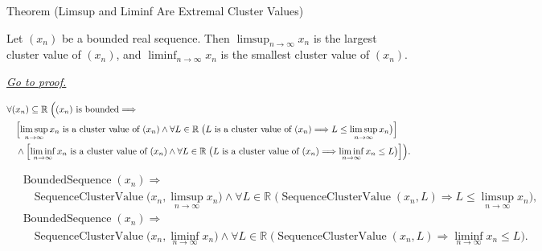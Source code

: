 \begin{theorembox}{Theorem (Limsup and Liminf Are Extremal Cluster Values)}
\begin{theorem}
\label{thm:limsup-liminf-extremal-cluster-values}
Let $(x_n)$ be a bounded real sequence. Then
$\limsup_{n\to\infty}x_n$ is the largest cluster value of $(x_n)$, and
$\liminf_{n\to\infty}x_n$ is the smallest cluster value of $(x_n)$.

\smallskip
\noindent
\hyperref[prf:limsup-liminf-extremal-cluster-values]{\textit{Go to proof.}}
\end{theorem}
\end{theorembox}

\begin{remark*}
\[
\begin{aligned}
&\forall (x_n)\subseteq\mathbb{R}\;
\Bigl(
  (x_n)\text{ is bounded}
  \Longrightarrow\\
&\quad
  \Bigl[
    \limsup_{n\to\infty}x_n
    \text{ is a cluster value of }(x_n)
    \land
    \forall L\in\mathbb{R}\;
    \bigl(L\text{ is a cluster value of }(x_n)
    \Longrightarrow L\le \limsup_{n\to\infty}x_n\bigr)
  \Bigr]\\
&\quad\land
  \Bigl[
    \liminf_{n\to\infty}x_n
    \text{ is a cluster value of }(x_n)
    \land
    \forall L\in\mathbb{R}\;
    \bigl(L\text{ is a cluster value of }(x_n)
    \Longrightarrow \liminf_{n\to\infty}x_n\le L\bigr)
  \Bigr]
\Bigr).
\end{aligned}
\]
\end{remark*}

\begin{remark*}
\[
\begin{aligned}
&\operatorname{BoundedSequence}(x_n)
\Longrightarrow\\
&\quad
\operatorname{SequenceClusterValue}
\bigl(x_n,\limsup_{n\to\infty}x_n\bigr)
\land
\forall L\in\mathbb{R}\;
\bigl(\operatorname{SequenceClusterValue}(x_n,L)
\Longrightarrow L\le \limsup_{n\to\infty}x_n\bigr),\\
&\operatorname{BoundedSequence}(x_n)
\Longrightarrow\\
&\quad
\operatorname{SequenceClusterValue}
\bigl(x_n,\liminf_{n\to\infty}x_n\bigr)
\land
\forall L\in\mathbb{R}\;
\bigl(\operatorname{SequenceClusterValue}(x_n,L)
\Longrightarrow \liminf_{n\to\infty}x_n\le L\bigr).
\end{aligned}
\]
\end{remark*}

